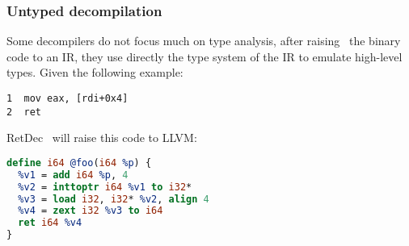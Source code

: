 \documentclass[compsoc,conference,a4paper,10pt,times]{IEEEtran}
\begin{document}


\subsubsection*{Untyped decompilation}
Some decompilers do not focus much on type analysis, 
after raising~\cite{goodman_lifting_2018,yadavalli_raising_2019} the binary code to an IR, they use 
directly the type system of the IR to emulate high-level types. 
Given the following example:
\begin{lstlisting}[language={[x86masm]Assembler},caption={Pointer increment then dereference},label={lst:derefasm}]
1  mov eax, [rdi+0x4]
2  ret
\end{lstlisting}
RetDec~\cite{kroustek_retdec_2017} will raise this code to LLVM:
\begin{lstlisting}[language={LLVM}, caption={Pointer increment then dereference (raised LLVM)}, label={lst:derefllvm}]
define i64 @foo(i64 %p) {
  %v1 = add i64 %p, 4
  %v2 = inttoptr i64 %v1 to i32*
  %v3 = load i32, i32* %v2, align 4
  %v4 = zext i32 %v3 to i64
  ret i64 %v4
}
\end{lstlisting}
\end{document}
